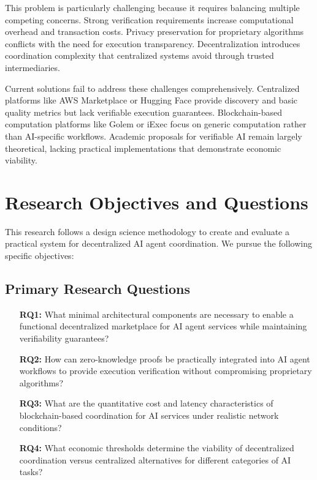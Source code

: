 This problem is particularly challenging because it requires balancing multiple competing concerns. Strong verification requirements increase computational overhead and transaction costs. Privacy preservation for proprietary algorithms conflicts with the need for execution transparency. Decentralization introduces coordination complexity that centralized systems avoid through trusted intermediaries.

Current solutions fail to address these challenges comprehensively. Centralized platforms like AWS Marketplace or Hugging Face provide discovery and basic quality metrics but lack verifiable execution guarantees. Blockchain-based computation platforms like Golem or iExec focus on generic computation rather than AI-specific workflows. Academic proposals for verifiable AI remain largely theoretical, lacking practical implementations that demonstrate economic viability.

\section{Research Objectives and Questions}

This research follows a design science methodology to create and evaluate a practical system for decentralized AI agent coordination. We pursue the following specific objectives:

\subsection{Primary Research Questions}

\begin{enumerate}
    \item[\textbf{RQ1:}] What minimal architectural components are necessary to enable a functional decentralized marketplace for AI agent services while maintaining verifiability guarantees?
    
    \item[\textbf{RQ2:}] How can zero-knowledge proofs be practically integrated into AI agent workflows to provide execution verification without compromising proprietary algorithms?
    
    \item[\textbf{RQ3:}] What are the quantitative cost and latency characteristics of blockchain-based coordination for AI services under realistic network conditions?
    
    \item[\textbf{RQ4:}] What economic thresholds determine the viability of decentralized coordination versus centralized alternatives for different categories of AI tasks?
\end{enumerate}

